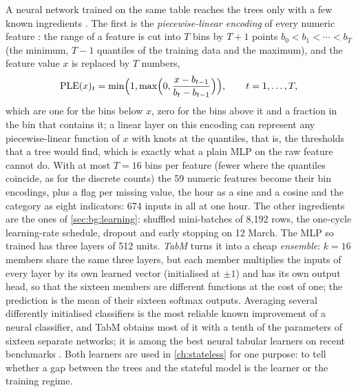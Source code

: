 A neural network trained on the same table reaches the trees only with a few known
ingredients \cite{holzmuller2024betterbydefault}.  The first is the \emph{piecewise-linear encoding} of every numeric feature
\cite{gorishniy2022embeddings}: the range of a feature is cut into $T$ bins by $T + 1$
points $b_0 < b_1 < \cdots < b_T$ (the minimum, $T - 1$ quantiles of the training data and
the maximum), and the feature value $x$ is replaced by $T$ numbers,
\begin{equation}
  \operatorname{PLE}(x)_t = \min\Bigl(1, \max\Bigl(0, \frac{x - b_{t-1}}{b_t - b_{t-1}}\Bigr)\Bigr), \qquad t = 1, \ldots, T,
  \label{eq:ple}
\end{equation}
which are one for the bins below $x$, zero for the bins above it and a fraction in the bin
that contains it; a linear layer on this encoding can represent any piecewise-linear
function of $x$ with knots at the quantiles, that is, the thresholds that a tree would
find, which is exactly what a plain MLP on the raw feature cannot do.  With at most
$T = 16$ bins per feature (fewer where the quantiles coincide, as for the discrete counts)
the 59 numeric features become their bin encodings, plus a flag per missing value, the
hour as a sine and a cosine and the category as eight indicators: 674 inputs in all at one
hour.
The other ingredients are the ones of \cref{sec:bg:learning}: shuffled mini-batches of
8{,}192 rows, the one-cycle learning-rate schedule, dropout and early stopping on 12 March.
The MLP so trained has three layers of 512 units.  \emph{TabM} \cite{gorishniy2025tabm}
turns it into a cheap \emph{ensemble}: $k = 16$ members share the same three layers, but
each member multiplies the inputs of every layer by its own learned vector (initialised at
$\pm 1$) and has its own output head, so that the sixteen members are different functions
at the cost of one; the prediction is the mean of their sixteen softmax outputs.  Averaging
several differently initialised classifiers is the most reliable known improvement of a
neural classifier, and TabM obtains most of it with a tenth of the parameters of sixteen
separate networks; it is among the best neural tabular learners on recent benchmarks
\cite{jiang2026omnitabbench}.  Both learners are used in \cref{ch:stateless} for one
purpose: to tell whether a gap between the trees and the stateful model is the learner or
the training regime.
